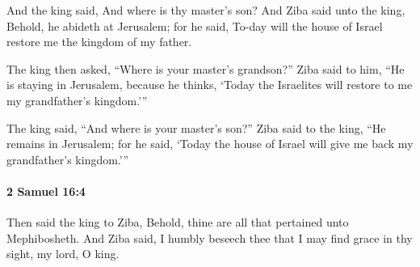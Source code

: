 			\begin{versebox}
					\item[BHS] 
					\item[ASV] And the king said, And where is thy master's son? And Ziba said unto the king, Behold, he abideth at Jerusalem; for he said, To-day will the house of Israel restore me the kingdom of my father.
					\item[NIV] The king then asked, “Where is your master’s grandson?” Ziba said to him, “He is staying in Jerusalem, because he thinks, ‘Today the Israelites will restore to me my grandfather’s kingdom.’”
					\item[NRSV] The king said, “And where is your master’s son?” Ziba said to the king, “He remains in Jerusalem; for he said, ‘Today the house of Israel will give me back my grandfather’s kingdom.’”
			\end{versebox}

		\paragraph{2 Samuel 16:4} %
			\label{2SAMUEL-16-4}

			Then said the king to Ziba, Behold, thine are all that pertained unto Mephibosheth. And Ziba said, I humbly beseech thee that I may find grace in thy sight, my lord, O king.

